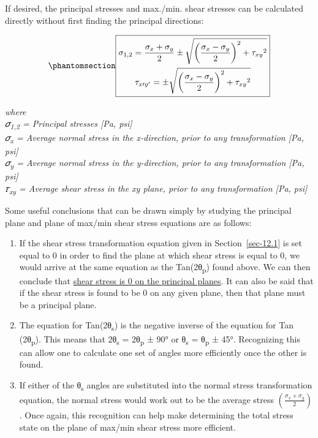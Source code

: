 \documentclass[
  letterpaper,
  DIV=11,
  numbers=noendperiod]{scrreprt}
\theoremstyle{definition}
\theoremstyle{remark}
\begin{document}
If desired, the principal stresses and max./min. shear stresses can be
calculated directly without first finding the principal directions:

\begin{equation}\phantomsection\label{eq-12.3}{
\boxed{\begin{gathered}
\sigma_{1,2}=\frac{\sigma_x+\sigma_y}{2} \pm \sqrt{\left(\frac{\sigma_x-\sigma_y}{2}\right)^2+\tau_{x y}{ }^2} \\
\tau_{x \prime y^{\prime}}= \pm \sqrt{\left(\frac{\sigma_x-\sigma_y}{2}\right)^2+\tau_{x y}{ }^2}
\end{gathered}}
}\end{equation}

\emph{where}\\
\emph{𝜎\textsubscript{1,2} = Principal stresses {[}Pa, psi{]}}\\
\emph{𝜎\textsubscript{x} = Average normal stress in the x-direction,
prior to any transformation {[}Pa, psi{]}}\\
\emph{𝜎\textsubscript{y} = Average normal stress in the y-direction,
prior to any transformation {[}Pa, psi{]}}\\
\emph{𝜏\textsubscript{xy} = Average shear stress in the xy plane, prior
to any transformation {[}Pa, psi{]}}

Some useful conclusions that can be drawn simply by studying the
principal plane and plane of max/min shear stress equations are as
follows:

\begin{enumerate}
\def\labelenumi{\arabic{enumi}.}
\item
  If the shear stress transformation equation given in
  Section~\ref{sec-12.1} is set equal to 0 in order to find the plane at
  which shear stress is equal to 0, we would arrive at the same equation
  as the Tan(2θ\textsubscript{p}) found above. We can then conclude that
  \ul{shear stress is 0 on the principal planes}. It can also be said
  that if the shear stress is found to be 0 on any given plane, then
  that plane must be a principal plane.
\item
  The equation for Tan(2θ\textsubscript{s}) is the negative inverse of
  the equation for Tan (2θ\textsubscript{p}). This means that
  2θ\textsubscript{s} = 2θ\textsubscript{p} ± 90° or θ\textsubscript{s}
  = θ\textsubscript{p} ± 45°. Recognizing this can allow one to
  calculate one set of angles more efficiently once the other is found.
\item
  If either of the θ\textsubscript{s} angles are substituted into the
  normal stress transformation equation, the normal stress would work
  out to be the average stress
  \(\left(\frac{\sigma_x+\sigma_y}{2}\right)\). Once again, this
  recognition can help make determining the total stress state on the
  plane of max/min shear stress more efficient.
\end{enumerate}
\end{document}
